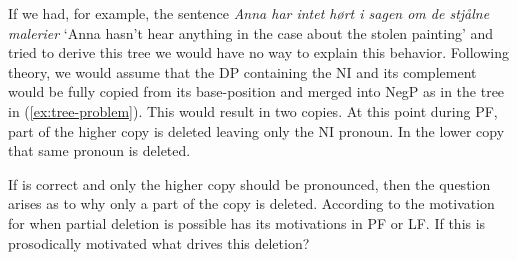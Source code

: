 \documentclass[12pt, letterpaper]{article}
\begin{document}
If we had, for example, the sentence \emph{Anna har intet hørt i sagen om de stjålne malerier} `Anna hasn't hear anything in the case about the stolen painting' and tried to derive this tree we would have no way to explain this behavior. Following \citet{zeijlstraSyntacticallyComplexStatus2011} theory, we would assume that the DP containing the NI and its complement would be fully copied from its base-position and merged into NegP as in the tree in (\ref{ex:tree-problem}). This would result in two copies. 
\pagebreak
\ea \label{ex:tree-problem}
\z 
At this point during PF, part of the higher copy is deleted leaving only the NI pronoun. In the lower copy that same pronoun is deleted. 
\ea	\label{ex:tree} 

\z 
If \citet{chomskyMinimalistProgramLinguistic1993} is correct and only the higher copy should be pronounced, then the question arises as to why only a part of the copy is deleted. According to \citet{fanselowRemarksEconomyPronunciation2001,fanselowDistributedDeletion2002} the motivation for when partial deletion is possible has its motivations in PF or LF. If this is prosodically motivated what drives this deletion?

\end{document}
